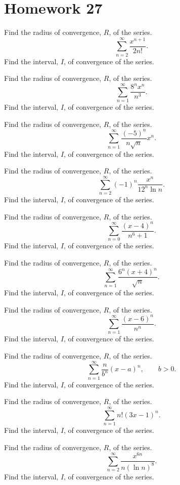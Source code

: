 \section*{Homework 27}
\begin{problem}[WebAssign HW 27, \# 1]
Find the radius of convergence, $R$, of the series.
\[
\sum_{n=2}^\infty\frac{x^{n+1}}{2n!}.
\]
Find the interval, $I$, of convergence of the series.
\end{problem}
\begin{problem}[WebAssign HW 27, \# 2]
Find the radius of convergence, $R$, of the series.
\[
\sum_{n=1}^\infty\frac{8^nx^n}{n^3}.
\]
Find the interval, $I$, of convergence of the series.
\end{problem}
\begin{problem}[WebAssign HW 27, \# 3]
Find the radius of convergence, $R$, of the series.
\[
\sum_{n=1}^\infty\frac{(-5)^n}{n\sqrt{n}}x^n.
\]
Find the interval, $I$, of convergence of the series.
\end{problem}
\begin{problem}[WebAssign HW 27, \# 4]
Find the radius of convergence, $R$, of the series.
\[
\sum_{n=2}^\infty(-1)^n\frac{x^n}{12^n\ln n}.
\]
Find the interval, $I$, of convergence of the series.
\end{problem}
\begin{problem}[WebAssign HW 27, \# 5]
Find the radius of convergence, $R$, of the series.
\[
\sum_{n=0}^\infty\frac{(x-4)^n}{n^6+1}.
\]
Find the interval, $I$, of convergence of the series.
\end{problem}
\begin{problem}[WebAssign HW 27, \# 6]
Find the radius of convergence, $R$, of the series.
\[
\sum_{n=1}^\infty\frac{6^n(x+4)^n}{\sqrt{n}}.
\]
Find the interval, $I$, of convergence of the series.
\end{problem}
\begin{problem}[WebAssign HW 27, \# 7]
Find the radius of convergence, $R$, of the series.
\[
\sum_{n=1}^\infty\frac{(x-6)^n}{n^n}.
\]
Find the interval, $I$, of convergence of the series.
\end{problem}
\begin{problem}[WebAssign HW 27, \# 8]
Find the radius of convergence, $R$, of the series.
\[
\sum_{n=1}^\infty\frac{n}{b^n}(x-a)^n, \qquad b>0.
\]
Find the interval, $I$, of convergence of the series.
\end{problem}
\begin{problem}[WebAssign HW 27, \# 9]
Find the radius of convergence, $R$, of the series.
\[
\sum_{n=1}^\infty n!(3x-1)^n.
\]
Find the interval, $I$, of convergence of the series.
\end{problem}
\begin{problem}[WebAssign HW 27, \# 10]
Find the radius of convergence, $R$, of the series.
\[
\sum_{n=2}^\infty\frac{x^{6n}}{n(\ln n)^8}.
\]
Find the interval, $I$, of convergence of the series.
\end{problem}
\newpage
